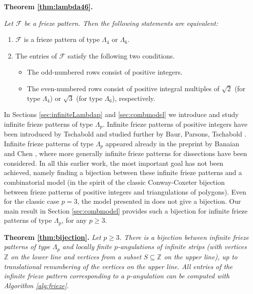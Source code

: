 \documentclass[11pt,a4paper]{amsart}
\theoremstyle{definition}
\numberwithin{equation}{section}
\begin{document}
\noindent
{\bf Theorem \ref{thm:lambda46}.} 
{\em Let $\mathcal{F}$ be a frieze pattern. Then the following statements are equivalent:
\begin{enumerate}
\item[{(a)}] $\mathcal{F}$ is a frieze pattern of type $\Lambda_4$ or $\Lambda_6$.
\item[{(b)}] The entries of $\mathcal{F}$ satisfy the following two conditions. 
\begin{itemize}
\item[{(i)}] The odd-numbered rows consist of positive integers.
\item[{(ii)}] The even-numbered rows consist of positive integral multiples of $\sqrt{2}$ (for type $\Lambda_4$)
or $\sqrt{3}$ (for type $\Lambda_6$), respectively.
\end{itemize}
\end{enumerate}
}

\medskip

In Sections \ref{sec:infiniteLambdap} and \ref{sec:combmodel} we introduce and study infinite
frieze patterns of type $\Lambda_p$. Infinite frieze patterns of positive integers have been introduced 
by Tschabold \cite{T15} and studied further by Baur, Parsons, Tschabold \cite{BPT16}. Infinite frieze patterns 
of type $\Lambda_p$ appeared already in the preprint by Banaian and Chen \cite{BC21}, where 
more generally infinite frieze patterns for dissections have been considered. In all this earlier work,
the most important goal has not been achieved, namely finding a bijection between these infinite 
frieze patterns and a combinatorial model (in the spirit 
of the classic Conway-Coxeter bijection between frieze patterns of positive integers and triangulations 
of polygons). Even for the classic case $p=3$, the model presented in \cite{BPT16} does not give 
a bijection. Our main result in Section \ref{sec:combmodel} provides such a bijection for 
infinite frieze patterns of type $\Lambda_p$, for any $p\ge 3$. 
\medskip

\noindent
{\bf Theorem \ref{thm:bijection}.}
{\em Let $p\ge 3$. There is a bijection between infinite frieze patterns of type $\Lambda_p$ and
locally finite 
$p$-angulations of infinite strips (with vertices $\mathbb{Z}$ on the lower line and vertices
from a subset $S\subseteq \mathbb{Z}$ on the upper line), up to translational renumbering 
of the vertices on the upper line. All entries of the infinite frieze pattern corresponding to a
$p$-angulation can be computed with Algorithm \ref{alg:frieze}. 
}
 \medskip
 
\end{document}
